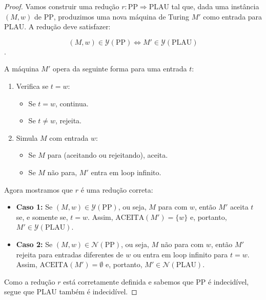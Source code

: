 \documentclass{article}
\begin{document}
\renewcommand{\proofname}{\textbf{Demonstração}}
\begin{proof}
    Vamos construir uma redução $r : \mathrm{PP} \Rightarrow
    \mathrm{PLAU}$ tal que, dada uma instância $(M, w)$ de
    $\mathrm{PP}$, produzimos uma nova máquina de Turing $M'$ como
    entrada para $\mathrm{PLAU}$. A redução deve satisfazer:

    $$(M, w) \in \mathcal{Y}(\mathrm{PP})
    \iff M' \in \mathcal{Y}(\mathrm{PLAU})$$.

    \noindent A máquina $M'$ opera da seguinte forma para uma entrada $t$:

    \begin{enumerate}[itemsep={2pt}, topsep={4pt}, parsep={0pt},
            label={\textbf{\arabic{*}.}}]
        \item Verifica se $t = w$:
            \begin{itemize}
                \item Se $t = w$, continua.
                \item Se $t \neq w$, rejeita.
            \end{itemize}
        \item Simula $M$ com entrada $w$:
            \begin{itemize}
                \item Se $M$ para (aceitando ou rejeitando), aceita.
                \item Se $M$ não para, $M'$ entra em loop infinito.
            \end{itemize}
    \end{enumerate}

    \vspace{8pt}

    \noindent Agora mostramos que $r$ é uma redução correta:

    \begin{itemize}[itemsep={2pt}, topsep={4pt}]
        \item \textbf{Caso 1:} Se $(M, w) \in
            \mathcal{Y}(\mathrm{PP})$, ou seja, $M$ para com $w$,
            então $M'$ aceita $t$ se, e somente se, $t = w$. Assim,
            $\mathrm{ACEITA}(M') = \{w\}$ e, portanto, $M' \in
            \mathcal{Y}(\mathrm{PLAU})$.

        \item \textbf{Caso 2:} Se $(M, w) \in
            \mathcal{N}(\mathrm{PP})$, ou seja, $M$ não para com $w$,
            então $M'$ rejeita para entradas diferentes de $w$ ou
            entra em loop infinito para $t = w$. Assim,
            $\mathrm{ACEITA}(M') = \emptyset$ e, portanto, $M' \in
            \mathcal{N}(\mathrm{PLAU})$.
    \end{itemize}

    \vspace{8pt}

    \noindent Como a redução $r$ está corretamente definida e sabemos
    que $\mathrm{PP}$ é
    indecidível, segue que $\mathrm{PLAU}$ também é indecidível.
\end{proof}

\end{document}
